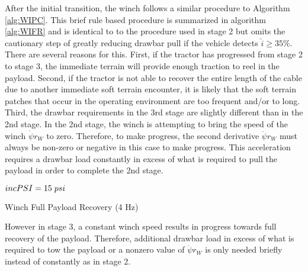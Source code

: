 After the initial transition, the winch follows a similar procedure to Algorithm \ref{alg:WIPC}. This brief rule based procedure is summarized in algorithm \ref{alg:WIFR} and is identical to to the procedure used in stage 2 but omits the cautionary step of greatly reducing drawbar pull if the vehicle detects $\hat{i} \geq 35\%$. There are several reasons for this. First, if the tractor has progressed from stage 2 to stage 3, the immediate terrain will provide enough traction to reel in the payload. Second, if the tractor is not able to recover the entire length of the cable due to another immediate soft terrain encounter, it is likely that the soft terrain patches that occur in the operating environment are too frequent and/or to long. Third, the drawbar requirements in the 3rd stage are slightly different than in the 2nd stage. In the 2nd stage, the winch is attempting to bring the speed of the winch $\dot\psi r_W$ to zero. Therefore, to make progress, the second derivative $\ddot\psi r_W$ must always be non-zero or negative in this case to make progress. This acceleration requires a drawbar load constantly in excess of what is required to pull the payload in order to complete the 2nd stage.
\begin{algorithm}[hb]
\SetAlgoLined
\vspace{5pt}
 $incPSI = 15\hspace{1mm}psi$\;
 \caption{Winch Full Payload Recovery (4 Hz)}\label{alg:WIFR}
\end{algorithm}
However in stage 3, a constant winch speed results in progress towards full recovery of the payload. Therefore, additional drawbar load in excess of what is required to tow the payload or a nonzero value of $\ddot\psi r_W$ is only needed briefly instead of constantly as in stage 2.